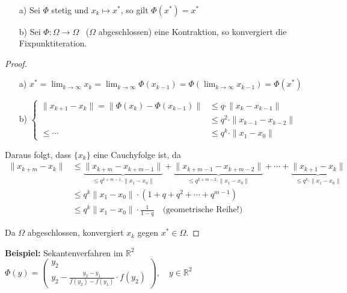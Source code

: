 \begin{lemma}[Konvergenz]
~ %
\begin{enumerate}
\item[a)] Sei $\Phi$ stetig und $x_k \longmapsto x^*$, so gilt $\Phi(x^*)=x^*$
\item[b)] Sei $\Phi: \Omega \longrightarrow \Omega$ \ ($\Omega$ abgeschlossen) eine Kontraktion, so konvergiert die Fixpunktiteration.
\end{enumerate}
\end{lemma}

\begin{proof}
~
\begin{enumerate}
\item[a)] $x^*=\lim_{k \to \infty}x_k=\lim_{k \to \infty}\Phi(x_{k-1})=\Phi(\lim_{k \to \infty}x_{k-1})=\Phi(x^*)$
\item[b)] %
$\left\{\begin{aligned}
\|x_{k+1}-x_k\| = \|\Phi(x_k)-\Phi(x_{k-1})\| &\leq q\cdot \|x_k-x_{k-1}\| \\
                                              &\leq q^2\cdot \|x_{k-1}-x_{k-2}\| \\
                                   \leq \cdots&\leq q^k\cdot \|x_1-x_0\|
\end{aligned}\right.$
\end{enumerate}

Daraus folgt, dass $\{x_k\}$ eine Cauchyfolge ist, da
\begin{align*}
\|x_{k+m}-x_k\|&\leq \underbrace{\|x_{k+m}-x_{k+m-1}\|}_{\leq q^{k+m-1}\cdot \|x_1-x_0\|}
                  +\underbrace{\|x_{k+m-1}-x_{k+m-2}\|}_{\leq q^{k+m-2}\cdot \|x_1-x_0\|}
                  +\cdots
                  +\underbrace{\|x_{k+1}-x_k\|}_{\leq q^k\cdot \|x_1-x_0\|} \\
               &\leq q^k\|x_1-x_0\| \cdot (1+q+q^2+\cdots +q^{m-1})\\
               &\leq q^k\|x_1-x_0\| \cdot \frac{1}{1-q} \quad \mbox{(geometrische Reihe!)}
\end{align*}

Da $\Omega$ abgeschlossen, konvergiert $x_k$ gegen $x^* \in \Omega$.
\end{proof}

\noindent\textbf{Beispiel:} Sekantenverfahren im $\mathbb R^2$ \\\newline
$\Phi(y)=
\begin{pmatrix}
y_2 \\
y_2-\frac{y_2-y_1}{f(y_2)-f(y_1)}\cdot f(y_2)
\end{pmatrix}, \quad y\in \mathbb{R}^2$\\
\newline


